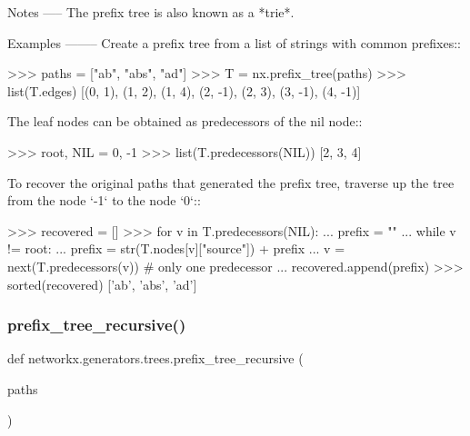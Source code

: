 \begin{DoxyVerb}
Notes
-----
The prefix tree is also known as a *trie*.


Examples
--------
Create a prefix tree from a list of strings with common prefixes::

    >>> paths = ["ab", "abs", "ad"]
    >>> T = nx.prefix_tree(paths)
    >>> list(T.edges)
    [(0, 1), (1, 2), (1, 4), (2, -1), (2, 3), (3, -1), (4, -1)]

The leaf nodes can be obtained as predecessors of the nil node::

    >>> root, NIL = 0, -1
    >>> list(T.predecessors(NIL))
    [2, 3, 4]

To recover the original paths that generated the prefix tree,
traverse up the tree from the node `-1` to the node `0`::

    >>> recovered = []
    >>> for v in T.predecessors(NIL):
    ...     prefix = ""
    ...     while v != root:
    ...         prefix = str(T.nodes[v]["source"]) + prefix
    ...         v = next(T.predecessors(v))  # only one predecessor
    ...     recovered.append(prefix)
    >>> sorted(recovered)
    ['ab', 'abs', 'ad']
\end{DoxyVerb}
 \mbox{\label{namespacenetworkx_1_1generators_1_1trees_a8e7c31c09253b1e1f5052437d5a7e267}} 
\subsubsection{\texorpdfstring{prefix\+\_\+tree\+\_\+recursive()}{prefix\_tree\_recursive()}}
{\footnotesize\ttfamily def networkx.\+generators.\+trees.\+prefix\+\_\+tree\+\_\+recursive (\begin{DoxyParamCaption}\item[{}]{paths }\end{DoxyParamCaption})}

